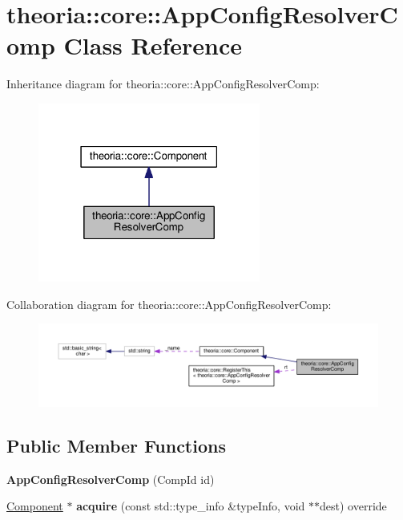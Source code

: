 \hypertarget{classtheoria_1_1core_1_1AppConfigResolverComp}{}\section{theoria\+:\+:core\+:\+:App\+Config\+Resolver\+Comp Class Reference}
\label{classtheoria_1_1core_1_1AppConfigResolverComp}


Inheritance diagram for theoria\+:\+:core\+:\+:App\+Config\+Resolver\+Comp\+:
\nopagebreak
\begin{figure}[H]
\begin{center}
\leavevmode
\includegraphics[width=207pt]{classtheoria_1_1core_1_1AppConfigResolverComp__inherit__graph}
\end{center}
\end{figure}


Collaboration diagram for theoria\+:\+:core\+:\+:App\+Config\+Resolver\+Comp\+:
\nopagebreak
\begin{figure}[H]
\begin{center}
\leavevmode
\includegraphics[width=350pt]{classtheoria_1_1core_1_1AppConfigResolverComp__coll__graph}
\end{center}
\end{figure}
\subsection*{Public Member Functions}
\begin{DoxyCompactItemize}
\item 
\mbox{\label{classtheoria_1_1core_1_1AppConfigResolverComp_a49f449b95efaa632d5398b161b28144e}} 
{\bfseries App\+Config\+Resolver\+Comp} (Comp\+Id id)
\item 
\mbox{\label{classtheoria_1_1core_1_1AppConfigResolverComp_af04af67f66e3bfea44ab76c33d64a51e}} 
\hyperlink{classtheoria_1_1core_1_1Component}{Component} $\ast$ {\bfseries acquire} (const std\+::type\+\_\+info \&type\+Info, void $\ast$$\ast$dest) override
\end{DoxyCompactItemize}

